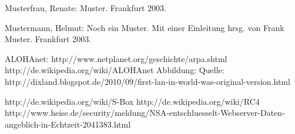 \documentclass[a4paper,13pt]{scrartcl}
\begin{document}
Musterfrau, Renate: Muster. Frankfurt 2003.


Mustermann, Helmut: Noch ein Muster. Mit einer Einleitung hrsg. von Frank Muster. Frankfurt 2003.

ALOHAnet: http://www.netplanet.org/geschichte/arpa.shtml
http://de.wikipedia.org/wiki/ALOHAnet
Abbildung: Quelle: http://dixland.blogspot.de/2010/09/first-lan-in-world-was-original-version.html

http://de.wikipedia.org/wiki/S-Box
http://de.wikipedia.org/wiki/RC4
http://www.heise.de/security/meldung/NSA-entschluesselt-Webserver-Daten-angeblich-in-Echtzeit-2041383.html
\end{document}
